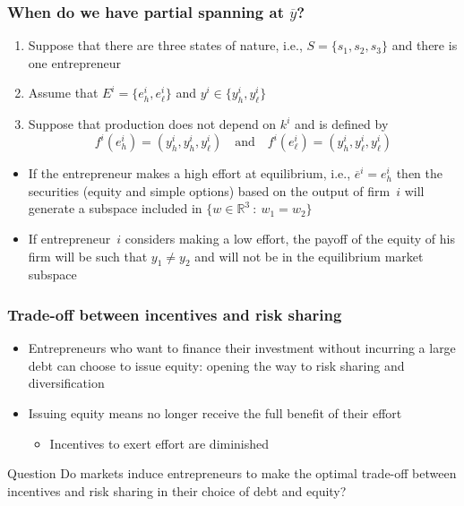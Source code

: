 \documentclass[blue]{beamer}
\def\R{\mathbb{R}}
\def\et{\quad \textrm{and} \quad}
\theoremstyle{definition}
\theoremstyle{example}
\begin{document}
\begin{frame}\frametitle{When do we have partial spanning at $\overline{y}$?}

\begin{example}
\begin{enumerate}
\item Suppose that there are three states of nature, i.e., $S=\{s_1,s_2,s_3\}$ and there is one entrepreneur
\item Assume that $E^i=\{e^i_h,e^i_\ell\}$ and $y^i \in \{y^i_h,y^i_\ell\}$
\item Suppose that production does not depend on $k^i$ and is defined by
\[
f^i(e^i_h) = (y^i_h,y^i_h,y^i_\ell) \et f^i(e^i_\ell) = (y^i_h,y^i_\ell,y^i_\ell)
\]
\end{enumerate}

\begin{itemize}
\item If the entrepreneur makes a high effort at equilibrium, i.e., $\overline{e}^i=e^i_h$ then the securities (equity and simple options) based on the output of firm~$i$ will generate a subspace
included in $\{w \in \R^3 \ \colon \ w_1 = w_2\}$

\item If entrepreneur~$i$ considers making a low effort, the payoff of the equity of his firm will be such that $y_1 \neq y_2$ and will not be in the equilibrium market subspace
\end{itemize}
\end{example}

\end{frame}


\begin{frame}\frametitle{Trade-off between incentives and risk sharing}

\begin{itemize}
\item Entrepreneurs who want to finance their investment without incurring a large debt can choose to issue equity: opening the way to risk sharing and diversification
\item Issuing equity means no longer receive the full benefit of their effort
    \begin{itemize}
    \item Incentives to exert effort are diminished
    \end{itemize}
\end{itemize}

\begin{block}{Question}
Do markets induce entrepreneurs to make the optimal trade-off between incentives and risk sharing in their choice of debt and equity?
\end{block}

\end{frame}
\end{document}
